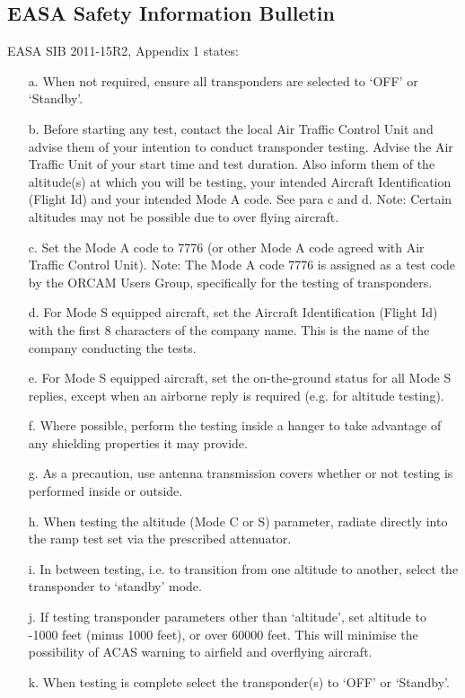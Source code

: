 \documentclass[a4paper]{article}
\begin{document}
\subsection{{EASA} Safety Information Bulletin}
EASA SIB 2011-15R2\cite{EASA_SIB_2011_15R2}, Appendix 1 states:
\begin{itemize}
\item[a.]{When not required, ensure all transponders are selected to ‘OFF’ or ‘Standby’.}
\item[b.]{Before starting any test, contact the local Air Traffic Control Unit and advise them of your intention to conduct transponder testing. Advise the Air Traffic Unit of your start time and test duration. Also inform them of the altitude(s) at which you will be testing, your intended Aircraft Identification (Flight Id) and your intended Mode A code. See para c and d. Note: Certain altitudes may not be possible due to over flying aircraft.}
\item[c.]{Set the Mode A code to 7776 (or other Mode A code agreed with Air Traffic Control Unit). Note: The Mode A code 7776 is assigned as a test code by the ORCAM Users Group, specifically for the testing of transponders.}
\item[d.]{For Mode S equipped aircraft, set the Aircraft Identification (Flight Id) with the first 8 characters of the company name. This is the name of the company conducting the tests.}
\item[e.]{For Mode S equipped aircraft, set the on-the-ground status for all Mode S replies, except when an airborne reply is required (e.g. for altitude testing).}
\item[f.]{Where possible, perform the testing inside a hanger to take advantage of any shielding properties it may provide.}
\item[g.]{As a precaution, use antenna transmission covers whether or not testing is performed inside or outside.}
\item[h.]{When testing the altitude (Mode C or S) parameter, radiate directly into the ramp test set via the prescribed attenuator.}
\item[i.]{In between testing, i.e. to transition from one altitude to another, select the transponder to ‘standby’ mode.}
\item[j.]{If testing transponder parameters other than ‘altitude’, set altitude to -1000 feet (minus 1000 feet), or over 60000 feet. This will minimise the possibility of ACAS warning to airfield and overflying aircraft.}
\item[k.]{When testing is complete select the transponder(s) to ‘OFF’ or ‘Standby’.}
\end{itemize}
\end{document}
